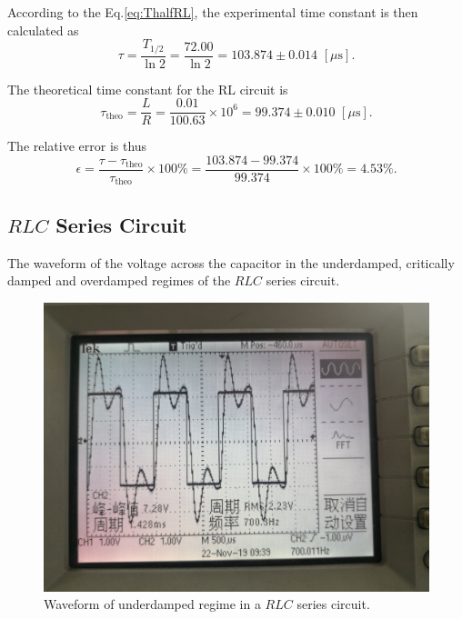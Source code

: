 \documentclass{article}
\begin{document}
According to the Eq.\eqref{eq:ThalfRL}, the experimental time constant is then calculated as
$$\tau = \frac{T_{1/2}}{\ln 2} = \frac{72.00}{\ln 2} = 103.874 \pm 0.014 \,\,[\mu\text{s}].$$

The theoretical time constant for the RL circuit is
$$\tau_{\text{theo}} = \frac{L}{R} = \frac{0.01}{100.63} \times 10^{6} = 99.374 \pm 0.010 \,\,[\mu\text{s}].$$

The relative error is thus
$$\epsilon = \frac{\tau-\tau_{\text{theo}}}{\tau_{\text{theo}}} \times 100\% = \frac{103.874 - 99.374}{99.374} \times 100\% = 4.53\%.$$

\subsection{$RLC$ Series Circuit}
The waveform of the voltage across the capacitor in the underdamped, critically damped and overdamped regimes of the $RLC$ series circuit.

\begin{figure}[H]\centering
    \includegraphics[scale=0.06]{3.jpg}
    \caption{Waveform of underdamped regime in a $RLC$ series circuit.}\label{FigUnderdamp}
\end{figure}
\end{document}
